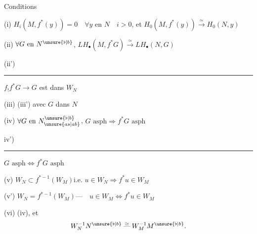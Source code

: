 
\qquad Conditions

(i) $H_i(M,f^*(y))=0\quad\forall y\text{ en }N\quad i>0$,
et $H_0(M,f^*(y))\xrightarrow{\simeq}H_0(N,y)$


(ii) $\forall G\text{ en }N^{\unsure{\flat|b}}$,
$LH_\bullet(M,f^*G)\xrightarrow{\simeq}LH_\bullet(N,G)$

(ii') \rule{3cm}{.4pt}\qquad $f_!f^*G\longrightarrow G$ est dans $W_N$


(iii) (iii') avec $G$ dans $N$

(iv) $\forall G\text{ en }N_{\unsure{as|ab}}^{\unsure{\flat|b}}$,
$G\text{ asph}\Longrightarrow f^*G\text{ asph}$

iv') \rule{4cm}{.4pt}\qquad $G\text{ asph}\Longleftrightarrow f^*G\text{ asph}$

(v) \qquad
$W_N\subset f^{*-1}(W_M)$\quad i.e. $u\in W_N\Longrightarrow f^*u\in W_M$

(v')\quad{}\quad{}\qquad
$W_N=f^{*-1}(W_M)$\quad $\text{---}\quad u\in W_M\Longleftrightarrow f^*u\in W_M$

(vi)  (iv), et
\[
W_N^{-1}N^{\unsure{\flat|b}}\overset{\simeq}{\mathbin{\text{---}}}W_M^{-1}M^{\unsure{\flat|b}}.
\]

